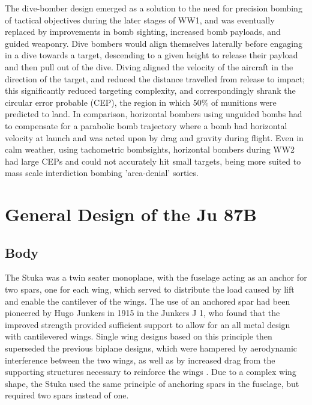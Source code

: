 \documentclass[a4paper, fontsize=11pt]{scrartcl} %
\begin{document}
The dive-bomber design emerged as a solution to the need for precision
bombing of tactical objectives during the later stages of
WW1, and was eventually replaced by improvements in bomb sighting,
increased bomb payloads, and guided weaponry. Dive bombers would align themselves
laterally before engaging in a dive towards a target,
descending to a given height to release their payload and then pull
out of the dive. Diving aligned the velocity of the aircraft in the
direction of the target, and reduced the distance travelled from release
to impact; this significantly reduced targeting complexity, and
correspondingly shrank the circular error probable (CEP), the
region in which 50\% of munitions were predicted to land. In comparison,
horizontal bombers using unguided bombs had to compensate for a parabolic
bomb trajectory where a bomb had horizontal velocity at launch and was
acted upon by drag and gravity during flight. Even in
calm weather, using tachometric bombsights, horizontal bombers during
WW2 had large CEPs and could not accurately hit small targets, being
more suited to mass scale interdiction bombing 'area-denial' sorties.

\section{General Design of the Ju 87B}
\subsection{Body}
The Stuka was a twin seater monoplane, with the fuselage acting as an
anchor for two spars, one for each wing, which served to distribute the
load caused by lift and enable the cantilever of the wings.
The use of an anchored spar had been pioneered by Hugo Junkers in 1915
\autocite{nasa4} in the Junkers J 1, who found that the improved
strength provided sufficient support to allow for an
all metal design with cantilevered wings. Single wing designs based on
this principle then superseded the previous biplane designs, which were
hampered by aerodynamic interference between the two wings, as well as
by increased drag from the supporting structures necessary to reinforce
the wings \autocite[p~.37]{peery12}. Due to a complex wing shape, the
Stuka used the same principle of anchoring spars in the fuselage, but
required two spars instead of one.
\end{document}
